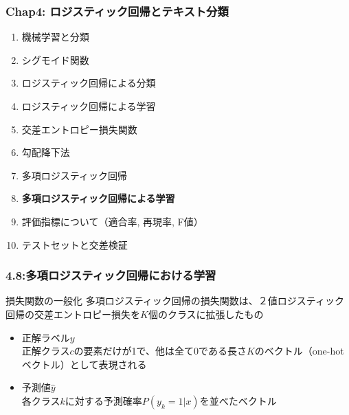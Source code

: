\documentclass[unicode,11pt]{beamer} %
\begin{document}
\begin{frame}
    \frametitle{Chap4: ロジスティック回帰とテキスト分類}
    \begin{block}{}
        \begin{enumerate}
            \item 機械学習と分類
            \item シグモイド関数
            \item ロジスティック回帰による分類
            \item ロジスティック回帰による学習
            \item 交差エントロピー損失関数
            \item 勾配降下法
            \item 多項ロジスティック回帰
            \item {\color{red}\textbf{多項ロジスティック回帰による学習}}
            \item 評価指標について（適合率, 再現率, F値）
            \item テストセットと交差検証
        \end{enumerate}
    \end{block}
\end{frame}

\begin{frame}
    \frametitle{4.8:多項ロジスティック回帰における学習}
    \begin{alertblock}{損失関数の一般化}
        多項ロジスティック回帰の損失関数は、２値ロジスティック回帰の交差エントロピー損失を$K$個のクラスに拡張したもの
        \begin{itemize}
            \item 正解ラベル$y$\\正解クラス$c$の要素だけが1で、他は全て0である長さ$K$のベクトル（one-hotベクトル）として表現される
            \item 予測値$\hat{y}$\\各クラス$k$に対する予測確率$P(y_k = 1|x)$を並べたベクトル
        \end{itemize}
    \end{alertblock}
\end{frame}
\end{document}
